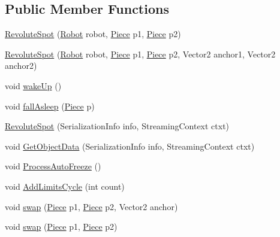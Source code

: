 \subsection*{Public Member Functions}
\begin{DoxyCompactItemize}
\item 
\hyperlink{classgearit_1_1src_1_1robot_1_1_revolute_spot_a3b00292e90252e654d88f4c48a48d0db}{Revolute\+Spot} (\hyperlink{classgearit_1_1src_1_1robot_1_1_robot}{Robot} robot, \hyperlink{classgearit_1_1src_1_1robot_1_1_piece}{Piece} p1, \hyperlink{classgearit_1_1src_1_1robot_1_1_piece}{Piece} p2)
\item 
\hyperlink{classgearit_1_1src_1_1robot_1_1_revolute_spot_ad6f408eb0645c572153976cf41a3e3cd}{Revolute\+Spot} (\hyperlink{classgearit_1_1src_1_1robot_1_1_robot}{Robot} robot, \hyperlink{classgearit_1_1src_1_1robot_1_1_piece}{Piece} p1, \hyperlink{classgearit_1_1src_1_1robot_1_1_piece}{Piece} p2, Vector2 anchor1, Vector2 anchor2)
\item 
void \hyperlink{classgearit_1_1src_1_1robot_1_1_revolute_spot_aa00f26cdc2c08b02d02da8588acaa1d9}{wake\+Up} ()
\item 
void \hyperlink{classgearit_1_1src_1_1robot_1_1_revolute_spot_a2a716df041db37d7016664ea3e4a1f16}{fall\+Asleep} (\hyperlink{classgearit_1_1src_1_1robot_1_1_piece}{Piece} p)
\item 
\hyperlink{classgearit_1_1src_1_1robot_1_1_revolute_spot_ac18550d29a93461096ae3811f2066781}{Revolute\+Spot} (Serialization\+Info info, Streaming\+Context ctxt)
\item 
void \hyperlink{classgearit_1_1src_1_1robot_1_1_revolute_spot_a59d7ec7a712a68c6945648795c5d5737}{Get\+Object\+Data} (Serialization\+Info info, Streaming\+Context ctxt)
\item 
void \hyperlink{classgearit_1_1src_1_1robot_1_1_revolute_spot_a508949c08beab8139d4b5a1b8d3010b0}{Process\+Auto\+Freeze} ()
\item 
void \hyperlink{classgearit_1_1src_1_1robot_1_1_revolute_spot_abbe5811a4889462e5ec677d3390e084e}{Add\+Limits\+Cycle} (int count)
\item 
void \hyperlink{classgearit_1_1src_1_1robot_1_1_revolute_spot_aa7c15741d3043c37410aeb72d69c471c}{swap} (\hyperlink{classgearit_1_1src_1_1robot_1_1_piece}{Piece} p1, \hyperlink{classgearit_1_1src_1_1robot_1_1_piece}{Piece} p2, Vector2 anchor)
\item 
void \hyperlink{classgearit_1_1src_1_1robot_1_1_revolute_spot_afb281c903af0446d1b81b433f6e0e419}{swap} (\hyperlink{classgearit_1_1src_1_1robot_1_1_piece}{Piece} p1, \hyperlink{classgearit_1_1src_1_1robot_1_1_piece}{Piece} p2)

\end{DoxyCompactItemize}
